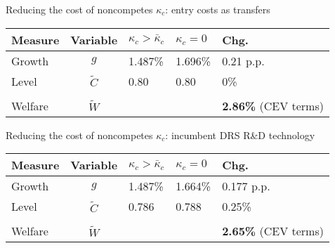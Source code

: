 \documentclass[english,usenames,dvipsnames]{beamer}
\begin{document}
\begin{frame}{Reducing the cost of noncompetes $\kappa_c$: entry costs as transfers}\label{reducing_kappa_c_table:entry_costs_as_transfers}
	\hyperlink{reducing_kappa_c_table}{}
	\begin{table}
		\centering
		\small
		\begin{tabular}{lclll}
			\toprule \toprule
			Measure & Variable & $\kappa_c > \bar{\kappa}_c$ & $\kappa_c = 0$ & Chg. \tabularnewline
			\midrule
			Growth & $g$ & 1.487\% & 1.696\% & 0.21 p.p. \tabularnewline
			Level & $\tilde{C}$  & 0.80 &  0.80 & 0\% \tabularnewline 
			\tabularnewline
			Welfare & $\tilde{W}$  &  & & \alert{\textbf{2.86\%}} (CEV terms)  \tabularnewline
			\bottomrule
		\end{tabular}
	\end{table}
\end{frame}

\begin{frame}{Reducing the cost of noncompetes $\kappa_c$: incumbent DRS R\&D technology}\label{reducing_kappa_c_table:incumbentDRS}
	\hyperlink{reducing_kappa_c_table}{}
	\begin{table}
		\centering
		\small
		\begin{tabular}{lclll}
			\toprule \toprule
			Measure & Variable & $\kappa_c > \bar{\kappa}_c$ & $\kappa_c = 0$ & Chg. \tabularnewline
			\midrule
			Growth & $g$ & 1.487\% & 1.664\% & 0.177 p.p. \tabularnewline
			Level & $\tilde{C}$  & 0.786 &  0.788 & 0.25\% \tabularnewline 
			\tabularnewline
			Welfare & $\tilde{W}$  &  & & \alert{\textbf{2.65\%}} (CEV terms)  \tabularnewline
			\bottomrule
		\end{tabular}
	\end{table}
	\hyperlink{decomposition_growth_increase}{}
	\hyperlink{parameters}{}
\end{frame}
\end{document}
